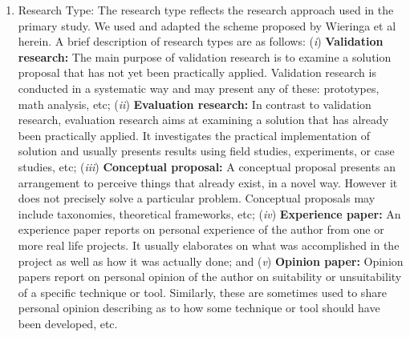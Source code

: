 \begin{enumerate}
\item Research Type: The research type reflects the research approach used in the primary study. We used and adapted the scheme proposed by Wieringa et al~\cite{Wieringa:2005:REP:1107677.1107683} herein. A brief description of research types are as follows: (\textit{i}) \textbf{Validation research:} The main purpose of validation research is to examine a solution proposal that has not yet been practically applied. Validation research is conducted in a systematic way and may present any of these: prototypes, math analysis, etc; (\textit{ii}) \textbf{Evaluation research:} In contrast to validation research, evaluation research aims at examining a solution that has already been practically applied. It investigates the practical implementation of solution and usually presents results using field studies, experiments, or case studies, etc; (\textit{iii}) \textbf{Conceptual proposal:} A conceptual proposal presents an arrangement to perceive things that already exist, in a novel way. However it does not precisely solve a particular problem. Conceptual proposals may include taxonomies, theoretical frameworks, etc; (\textit{iv}) \textbf{Experience paper:} An experience paper reports on personal experience of the author from one or more real life projects. It usually elaborates on what was accomplished in the project as well as how it was actually done; and (\textit{v}) \textbf{Opinion paper:} Opinion papers report on personal opinion of the author on suitability or unsuitability of a specific technique or tool. Similarly, these are sometimes used to share personal opinion describing as to how some technique or tool should have been developed, etc.

\end{enumerate}






